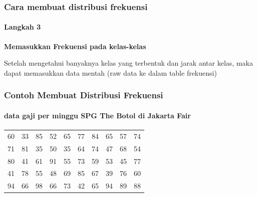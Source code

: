 \documentclass[main.tex]{subfiles}
\begin{document}
\begin{frame}[c]
	\frametitle{Cara membuat distribusi frekuensi}
	\framesubtitle{Langkah 3}

	\textbf{Memasukkan Frekuensi pada kelas-kelas}

	Setelah mengetahui banyaknya kelas yang terbentuk dan jarak antar kelas, maka dapat memasukkan data mentah (raw data ke dalam table frekuensi)
\end{frame}

{\bcb
\bodyw
\begin{frame}[c]
	\frametitle{Contoh Membuat Distribusi Frekuensi}
	\framesubtitle{data gaji per minggu SPG The Botol di Jakarta Fair }
	\begin{tabular}{llllllllll}
		60  &  33  &  85  &  52  &  65  &  77  &  84  &  65  &  57  &  74  \\
		71  &  81  &  35  &  50  &  35  &  64  &  74  &  47  &  68  &  54  \\
		80  &  41  &  61  &  91  &  55  &  73  &  59  &  53  &  45  &  77  \\
		41  &  78  &  55  &  48  &  69  &  85  &  67  &  39  &  76  &  60  \\
		94  &  66  &  98  &  66  &  73  &  42  &  65  &  94  &  89  &  88  \\
	\end{tabular}
\end{frame}}
\end{document}
